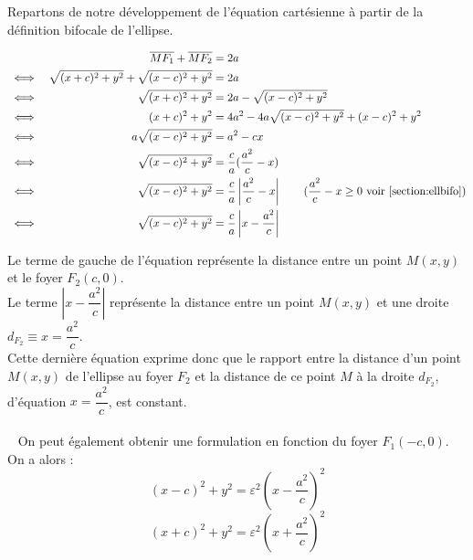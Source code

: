 Repartons de notre développement de l'équation cartésienne à partir de la définition bifocale de l'ellipse.
\begin{tcolorbox}[colback=white, colframe=green!60!black,  boxrule=0pt, title=Obtention de l'équation focale ou foyer-directrice de l'ellipse à partir de sa définition bifocale.]
\end{tcolorbox}

\begin{eleve}
    \begin{align*}
   && \overline{MF_1} + \overline{MF_2} &= 2a\\
    &\iff & \sqrt{(x+c)^2 + y^2} + \sqrt{(x-c)^2 + y^2} &= 2a\\
    &\iff & \sqrt{(x+c)^2 + y^2} &= 2a - \sqrt{(x-c)^2 + y^2}\\
&\iff&(x+c)^2 + y^2 &= 4a^2 - 4a\sqrt{(x-c)^2 + y^2}+ (x-c)^2 + y^2\\
&\iff& a\sqrt{(x-c)^2 + y^2} &= a^2 - cx\\
&\iff& \sqrt{(x-c)^2 + y^2} &= \dfrac{c}{a}(\dfrac{a^2}{c} - x)\\
&\iff& \sqrt{(x-c)^2 + y^2} &= \dfrac{c}{a}\left\lvert \dfrac{a^2}{c} - x\right\rvert  \tag{$\dfrac{a^2}{c} - x\geq0$ voir \ref{section:ellbifo}}\\
&\iff& \sqrt{(x-c)^2 + y^2} &= \dfrac{c}{a}\left\lvert x - \dfrac{a^2}{c}\right\rvert
\end{align*}

Le terme de gauche de l'équation représente la distance entre un point $M(x,y)$ et le foyer $F_2(c,0)$.\\
Le terme $\left\lvert x - \dfrac{a^2}{c}\right\rvert$ représente la distance entre un point $M(x,y)$ et une droite $d_{F_2} \equiv x = \dfrac{a^2}{c}$.\\
Cette dernière équation exprime donc que le rapport entre la distance d’un point $M(x,y)$ de l’ellipse au foyer $F_2$ 
et la distance de ce point $M$ à la droite $d_{F_2}$, d’équation $x = \dfrac{a^2}{c}$, est constant.\\
\\~
On peut également obtenir une formulation en fonction du foyer $F_1(-c,0)$.\\

On a alors :
\begin{equation}
    (x-c)^2 + y^2 = \varepsilon^2 \left(x - \dfrac{a^2}{c}\right)^2
\end{equation}
\begin{equation}
    (x+c)^2 + y^2 = \varepsilon^2 \left(x + \dfrac{a^2}{c}\right)^2
\end{equation}
\end{eleve}



